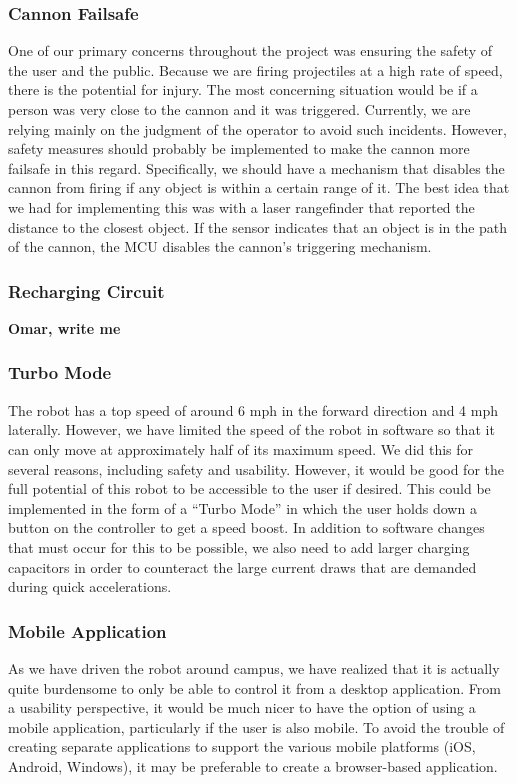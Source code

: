 \documentclass[letterpaper,12pt]{article}
\newcommand{\xxx}[1]{{\color{red}\bf #1}}
\begin{document}
\subsubsection{Cannon Failsafe}
One of our primary concerns throughout the project was ensuring the safety of
the user and the public. Because we are firing projectiles at a high rate of
speed, there is the potential for injury. The most concerning situation would be
if a person was very close to the cannon and it was triggered. Currently, we are
relying mainly on the judgment of the operator to avoid such incidents. However,
safety measures should probably be implemented to make the cannon more failsafe
in this regard. Specifically, we should have a mechanism that disables the
cannon from firing if any object is within a certain range of it. The best idea
that we had for implementing this was with a laser rangefinder that reported the
distance to the closest object. If the sensor indicates that an object is in the
path of the cannon, the MCU disables the cannon's triggering mechanism.

\subsubsection{Recharging Circuit}
\xxx{Omar, write me}

\subsubsection{Turbo Mode}
The robot has a top speed of around 6 mph in the forward direction and 4 mph
laterally. However, we have limited the speed of the robot in software so that
it can only move at approximately half of its maximum speed. We did this for
several reasons, including safety and usability. However, it would be good for
the full potential of this robot to be accessible to the user if desired. This
could be implemented in the form of a ``Turbo Mode'' in which the user holds
down a button on the controller to get a speed boost. In addition to software
changes that must occur for this to be possible, we also need to add larger
charging capacitors in order to counteract the large current draws that are
demanded during quick accelerations.

\subsubsection{Mobile Application}
As we have driven the robot around campus, we have realized that it is actually
quite burdensome to only be able to control it from a desktop application. From
a usability perspective, it would be much nicer to have the option of using a
mobile application, particularly if the user is also mobile. To avoid the
trouble of creating separate applications to support the various mobile
platforms (iOS, Android, Windows), it may be preferable to create a
browser-based application.
\end{document}
